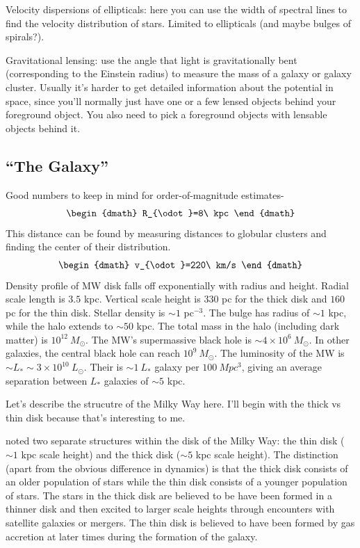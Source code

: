 \begin{enumerate}
      Velocity dispersions of ellipticals: here you can use the width of spectral lines to find the velocity distribution of stars. Limited to ellipticals (and maybe bulges of spirals?).
      
      Gravitational lensing: use the angle that light is gravitationally bent (corresponding to the Einstein radius) to measure the mass of a galaxy or galaxy cluster. Usually it's harder to get detailed information about the potential in space, since you'll normally just have one or a few lensed objects behind your foreground object. You also need to pick a foreground objects with lensable objects behind it.
      
\end{enumerate}

\subsection{``The Galaxy''}

Good numbers to keep in mind for order-of-magnitude estimates-
\begin{dgroup}
\begin{dmath}
R_{\odot}=8\ kpc
\end{dmath}
\end{dgroup}
This distance can be found by measuring distances to globular clusters and 
finding the center of their distribution.
\begin{dgroup}
\begin{dmath}
v_{\odot}=220\ km/s
\end{dmath}
\end{dgroup}
Density profile of MW disk falls off exponentially with radius and height.  
Radial scale length is $3.5$ kpc.  Vertical scale height is $330$ pc for the 
thick disk and $160$ pc for the thin disk.  Stellar density is $\sim1$ 
pc$^{-3}$.  The bulge has radius of $\sim1$ kpc, while the halo extends to 
$\sim50$ kpc.  The total mass in the halo (including dark matter) is 
$10^12\ M_{\odot}$.  The MW's supermassive black hole is 
$\sim4\times10^6\ M_{\odot}$.  In other galaxies, the central black hole can 
reach $10^9\ M_{\odot}$.  The luminosity of the MW is 
$\sim L_*\sim3\times10^{10}\ L_{\odot}$.  Their is $\sim1\ L_*$ galaxy per 
$100\ Mpc^3$, giving an average separation between $L_*$ galaxies of 
$\sim5$ kpc.  

Let's describe the strucutre of the Milky Way here.  I'll begin with the thick vs thin disk
because that's interesting to me.

 noted two separate structures within the disk of the
Milky Way: the thin disk ($\sim1$ kpc scale height) and the thick disk
($\sim5$ kpc scale height).  The distinction (apart from the obvious difference in dynamics)
is that the thick disk consists of an older population of stars while the thin disk consists
of a younger population of stars.
The stars in the thick disk are believed to be have been formed in a thinner disk and then
excited to larger scale heights through encounters with satellite galaxies or mergers.
The thin disk is believed to have been formed by gas
accretion at later times during the formation of the galaxy.


